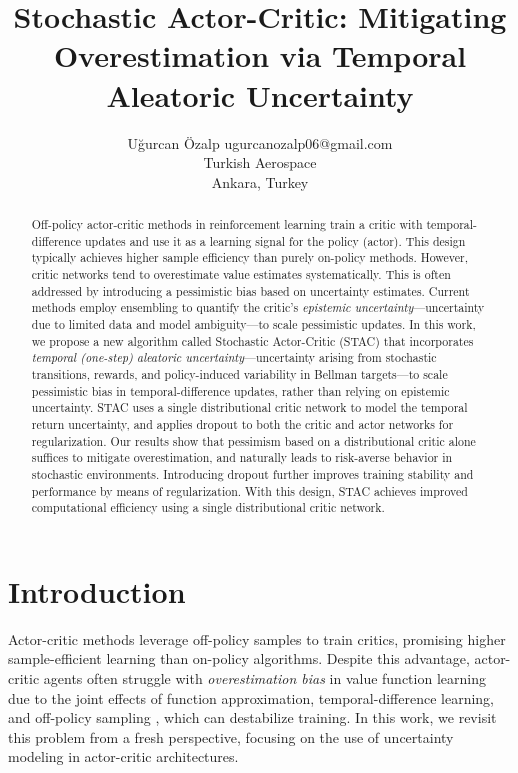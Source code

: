 \documentclass[10pt]{article} %
\title{Stochastic Actor-Critic: Mitigating Overestimation via Temporal Aleatoric Uncertainty}
\author{\name Uğurcan Özalp \email ugurcanozalp06@gmail.com \\
	\addr Turkish Aerospace \\
	Ankara, Turkey
	}
\begin{document}
\maketitle

\begin{abstract}
	
	Off-policy actor-critic methods in reinforcement learning train a critic with temporal-difference updates and use it as a learning signal for the policy (actor). This design typically achieves higher sample efficiency than purely on-policy methods. However, critic networks tend to overestimate value estimates systematically. This is often addressed by introducing a pessimistic bias based on uncertainty estimates. 
	Current methods employ ensembling to quantify the critic’s \textit{epistemic uncertainty}—uncertainty due to limited data and model ambiguity—to scale pessimistic updates.
	In this work, we propose a new algorithm called Stochastic Actor-Critic (STAC) that incorporates \textit{temporal (one-step) aleatoric uncertainty}—uncertainty arising from stochastic transitions, rewards, and policy-induced variability in Bellman targets—to scale pessimistic bias in temporal-difference updates, rather than relying on epistemic uncertainty.
	STAC uses a single distributional critic network to model the temporal return uncertainty, and applies dropout to both the critic and actor networks for regularization. 
	Our results show that pessimism based on a distributional critic alone suffices to mitigate overestimation, and naturally leads to risk-averse behavior in stochastic environments. Introducing dropout further improves training stability and performance by means of regularization. With this design, STAC achieves improved computational efficiency using a single distributional critic network. 
		
\end{abstract}



\section{Introduction}

Actor-critic methods leverage off-policy samples to train critics, promising higher sample-efficient learning than on-policy algorithms. Despite this advantage, actor-critic agents often struggle with \emph{overestimation bias} in value function learning due to the joint effects of function approximation, temporal-difference learning, and off-policy sampling \citep{thrun2014issues, sutton2018reinforcement, van2018deep}, which can destabilize training. In this work, we revisit this problem from a fresh perspective, focusing on the use of uncertainty modeling in actor-critic architectures. 
\end{document}
